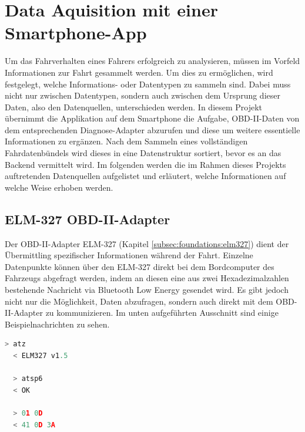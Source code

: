 \documentclass[oneside]{ausarbeitung}
\begin{document}
\section{Data Aquisition mit einer Smartphone-App}
\label{sec:implement_dataaquisition}

Um das Fahrverhalten eines Fahrers erfolgreich zu analysieren, müssen im Vorfeld Informationen zur Fahrt gesammelt werden. Um dies 
zu ermöglichen, wird festgelegt, welche Informations- oder Datentypen zu sammeln sind. Dabei muss nicht nur zwischen Datentypen, 
sondern auch zwischen dem Ursprung dieser Daten, also den Datenquellen, unterschieden werden. 
In diesem Projekt übernimmt die Applikation auf dem Smartphone die Aufgabe, OBD-II-Daten von dem entsprechenden Diagnose-Adapter 
abzurufen und diese um weitere essentielle Informationen zu ergänzen. Nach dem Sammeln eines vollständigen Fahrdatenbündels wird dieses 
in eine Datenstruktur sortiert, bevor es an das Backend vermittelt wird.
Im folgenden werden die im Rahmen dieses Projekts auftretenden Datenquellen aufgelistet und erläutert, welche Informationen auf welche
Weise erhoben werden.

\subsection*{ELM-327 OBD-II-Adapter}

Der OBD-II-Adapter ELM-327 (Kapitel \ref{subsec:foundations:elm327}) dient der Übermittling spezifischer Informationen während 
der Fahrt. Einzelne Datenpunkte können über den ELM-327 direkt bei dem Bordcomputer des Fahrzeugs abgefragt werden, indem an 
diesen eine aus zwei Hexadezimalzahlen bestehende Nachricht via Bluetooth Low Energy gesendet wird. Es gibt jedoch nicht nur die Möglichkeit,
Daten abzufragen, sondern auch direkt mit dem OBD-II-Adapter zu kommunizieren. Im unten aufgeführten Ausschnitt sind einige 
Beispielnachrichten zu sehen.

\begin{lstlisting}[language=Python, caption={Beispiel eines Requests für Echtzeit-Fahrdaten}]
  > atz
  < ELM327 v1.5

  > atsp6
  < OK

  > 01 0D
  < 41 0D 3A
\end{lstlisting}
\end{document}
